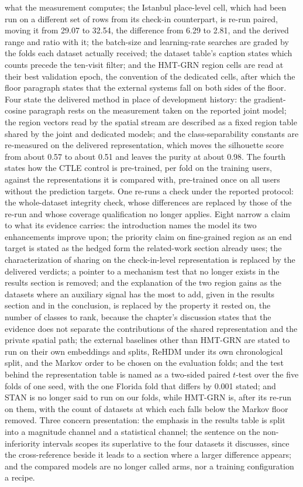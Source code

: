 what the measurement computes; the Istanbul place-level cell, which had been run on a different set
of rows from its check-in counterpart, is re-run paired, moving it from 29.07 to 32.54, the difference
from 6.29 to 2.81, and the derived range and ratio with it; the batch-size and learning-rate
searches are graded by the folds each dataset actually received; the dataset table's caption
states which counts precede the ten-visit filter; and the HMT-GRN region cells are read at their
best validation epoch, the convention of the dedicated cells, after which the floor paragraph states
that the external systems fall on both sides of the floor. Four
state the delivered method in place of development history: the gradient-cosine paragraph rests
on the measurement taken on the reported joint model; the region vectors read by the
spatial stream are described as a fixed region table shared by the joint and dedicated models;
and the class-separability constants are re-measured on the delivered representation, which
moves the silhouette score from about 0.57 to about 0.51 and leaves the purity at about 0.98. The fourth states how the CTLE control is pre-trained, per fold on
the training users, against the representations it is compared with, pre-trained once on all users
without the prediction targets.
One re-runs a check under the reported protocol: the
whole-dataset integrity check, whose differences are replaced by those of the re-run and whose
coverage qualification no longer applies. Eight narrow a claim to what its evidence
carries: the introduction names the model its two enhancements improve upon; the priority claim
on fine-grained region as an end target is stated as the hedged form the related-work section
already uses; the characterization of sharing on the check-in-level representation is replaced
by the delivered verdicts; a pointer to a mechanism test that no longer exists in the
results section is removed; and the explanation of the two region gains as the datasets where
an auxiliary signal has the most to add, given in the results section and in the conclusion, is
replaced by the property it rested on, the number of classes to rank, because the chapter's
discussion states that the evidence does not separate the contributions of the shared
representation and the private spatial path; the external baselines other than HMT-GRN are stated to run on their
own embeddings and splits, ReHDM under its own chronological split, and the Markov order to be chosen
on the evaluation folds; and the test behind the representation table is named as a two-sided paired
$t$-test over the five folds of one seed, with the one Florida fold that differs by 0.001 stated; and STAN is no longer said to run on our
folds, while HMT-GRN is, after its re-run on them, with the count of datasets at which each falls
below the Markov floor removed. Three
concern presentation: the emphasis in the results table is
split into a magnitude channel and a statistical channel; the sentence on the
non-inferiority intervals scopes its superlative to the four datasets it discusses, since the
cross-reference beside it leads to a section where a larger difference appears; and the compared
models are no longer called arms, nor a training configuration a recipe.

